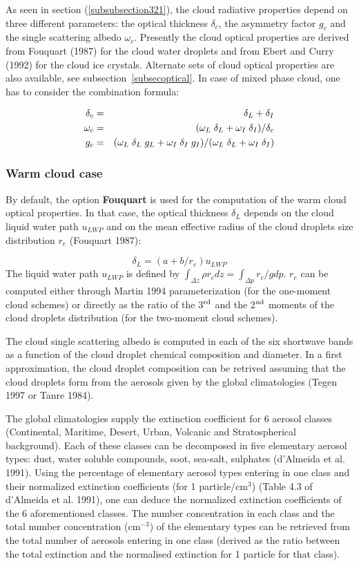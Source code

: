 As seen in section (\ref{subsubsection321}), the cloud radiative properties
depend on three different parameters: the optical thickness $\delta_c$, the
asymmetry factor $g_c$ and the single scattering albedo $\omega_c$. Presently
the cloud optical properties are derived from Fouquart (1987) for the cloud
water droplets and from Ebert and Curry (1992) for the cloud ice crystals.
Alternate sets of cloud optical properties are also available,
see subsection~\ref{subsecoptical}. In case of mixed phase cloud, one has
to consider the combination formula:

\medskip
\begin{eqnarray}\label{combination}
\delta_{c} &=& \delta_{L} + \delta_{I} \cr
\omega_{c} &=& (\omega_{L} \; \delta_{L} + \omega_{I} \; \delta_{I})/\delta_{c} \cr
g_c        &=& (\omega_{L} \; \delta_{L} \; g_{L} + \omega_{I} \; \delta_{I} \; g_{I})/(\omega_{L} \; \delta_{L} + \omega_{I} \; \delta_{I})
\end{eqnarray}
\medskip

%
\subsubsection{Warm cloud case}
%
By default, the option {\bf Fouquart} is used for the computation of the warm cloud optical properties. In that case, the optical thickness $\delta_L$ depends on the cloud liquid water path $u_{LWP}$ and on the mean effective radius of the cloud droplets size distribution $r_e$ (Fouquart 1987):

$$\displaystyle{\delta_L=(a+b/r_e)u_{LWP}}$$ 
The liquid water path $u_{LWP}$ is defined by $\int_{\Delta z} \rho r_c dz = \int_{\Delta p} r_c/gdp$. $r_e$ can be computed either through Martin 1994 parameterization (for the one-moment cloud schemes) or directly as the ratio of the 3$^{\rm rd}$ and the 2$^{\rm nd}$ moments of the cloud droplets distribution (for the two-moment cloud schemes).

The cloud single scattering albedo is computed in each of the six shortwave bands as a function of the cloud droplet chemical composition and diameter. In a first approximation, the cloud droplet composition can be retrived assuming that the cloud droplets form from the aerosols given by the global climatologies (Tegen 1997 or Tanre 1984).

The global climatologies supply the extinction coefficient for 6 aerosol classes (Continental, Maritime, Desert, Urban, Volcanic and Stratospherical background). Each of these classes can be decomposed in five elementary aerosol types: dust, water soluble compounds, soot, sea-salt, sulphates (d'Almeida et al. 1991). Using the percentage of elementary aerosol types entering in one class and their normalized extinction coefficients (for 1 particle/cm$^3$) (Table 4.3 of d'Almeida et al. 1991), one can deduce the normalized extinction coefficients of the 6 aforementioned classes. The number concentration in each class and the total number concentration (cm$^{-3}$) of the elementary types can be retrieved from the total number of aerosols entering in one class (derived as the ratio between the total extinction and the normalised extinction for 1 particle for that class).

